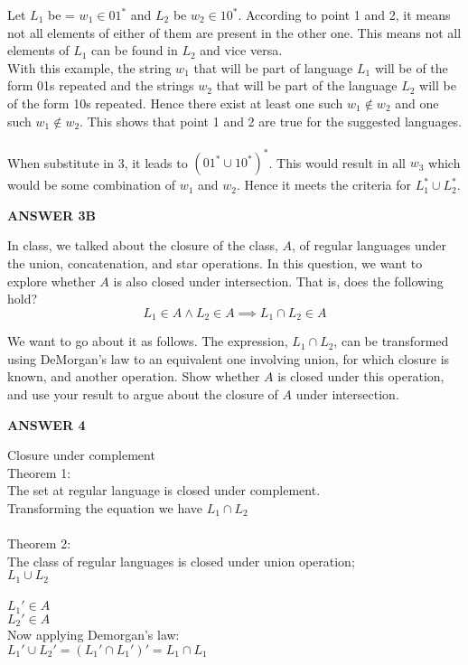\documentclass[addpoints]{exam}
\begin{document}
\begin{questions}
  Let $L_{1}$ be = ${w_{1} \in {01}^*}$ and $L_{2}$ be ${w_{2} \in {10}^*}$. According to point 1 and 2, it means not all elements of either of them are present in the other one. This means not all elements of $L_{1}$ can be found in $L_{2}$ and vice versa. \\
  
  With this example, the string $w_{1}$ that will be part of language $L_{1}$ will be of the form 01s repeated and the strings $w_{2}$ that will be part of the language $L_{2}$ will be of the form 10s repeated. Hence there exist at least one such $w_{1} \not\in w_{2}$ and one such $w_{1} \not\in  w_{2}$. This shows that point 1 and 2 are true for the suggested languages.
  \\ \\
  When substitute in 3, it leads to $({01}^* \cup {10}^*)^*$. This would result in all $w_{3}$ which would be some combination of $w_{1}$ and $w_{2}$. Hence it meets the criteria for $L_{1}^* \cup L_{2}^*$.

  \begin{center}
      \textbf{ANSWER 3B}
  \end{center}

  

  

\question[5] In class, we talked about the closure of the class, $A$, of regular languages under the union, concatenation, and star operations. In this question, we want to explore whether $A$ is also closed under intersection. That is, does the following hold?
  \[
    L_1\in A \land L_2\in A \implies L_1 \cap L_2\in A
  \]

  We want to go about it as follows. The expression, $L_1 \cap L_2$, can be transformed using DeMorgan's law to an equivalent one involving union, for which closure is known, and another operation. Show whether $A$ is closed under this operation, and use your result to argue about the closure of $A$ under intersection.
   \begin{center}
      \textbf{ANSWER 4 }
  \end{center} 
  Closure under complement \\ 
  Theorem 1:\\
  The set at regular language is closed under complement. \\
  Transforming the equation we have $L_{1} \cap L_{2}$ \\ \\
     Theorem 2: \\
     The class of regular languages is closed under union operation; \\
     $L_{1} \cup L_{2}$ \\ \\
     $L_{1}' \in A$\\
     $L_{2}' \in A$ \\
    Now applying Demorgan's law: \\
    $L_{1}' \cup L_{2}' = (L_{1}' \cap L_{1}')' = L_{1} \cap L_{1} $
  \\


\end{questions}
\end{document}
